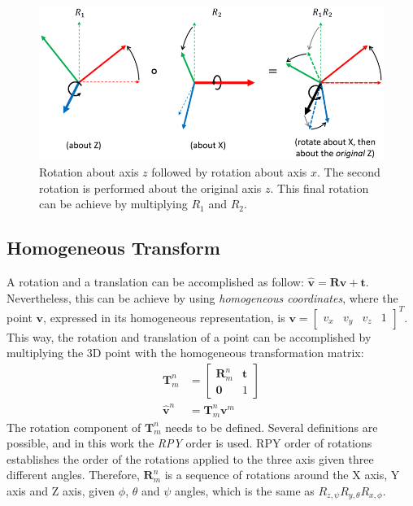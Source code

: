 \begin{figure}
    \centering
    \includegraphics[width=\textwidth]{Images/fig16-rotations.png}
    \caption[Rotation around axis $z$ followed by rotation about axis $x$]{Rotation about axis $z$ followed by rotation about axis $x$. The second rotation is performed about the original axis $z$. This final rotation can be achieve by multiplying $R_1$ and $R_2$.\cite{hauser-robotics-systems}}
    \label{fig:chapter1:transform:rotation_z_x}
\end{figure}

\subsection{Homogeneous Transform}
\label{subsec:chapter1:transform:rototranslation}
A rotation and a translation can be accomplished as follow: $\hat{\bm{v}} = \bm{R}\bm{v} + \bm{t}$. Nevertheless, this can be achieve by using \emph{homogeneous coordinates}, where the point $\bm{v}$, expressed in its homogeneous representation, is $\bm{v} = \begin{bmatrix}v_x & v_y & v_z & 1\end{bmatrix}^T$. This way, the rotation and translation of a point can be accomplished by multiplying the 3D point with the homogeneous transformation matrix:
\begin{align}
    \bm{T}_m^n &= \begin{bmatrix}
        \bm{R}_m^n & \bm{t} \\
        \bm{0} & 1
    \end{bmatrix}
    \label{eq:chapter1:transform:homogeneous_transform}\\
    \hat{\bm{v}}^n &= \bm{T}_m^n\bm{v}^m
\end{align}
The rotation component of $\bm{T}_m^n$ needs to be defined. Several definitions are possible, and in this work the \emph{RPY} order is used. RPY order of rotations establishes the order of the rotations applied to the three axis given three different angles. Therefore, $\bm{R}_m^n$ is a sequence of rotations around the X axis, Y axis and Z axis, given $\phi$, $\theta$ and $\psi$ angles, which is the same as $R_{z,\psi}R_{y,\theta}R_{x,\phi}$.\\

